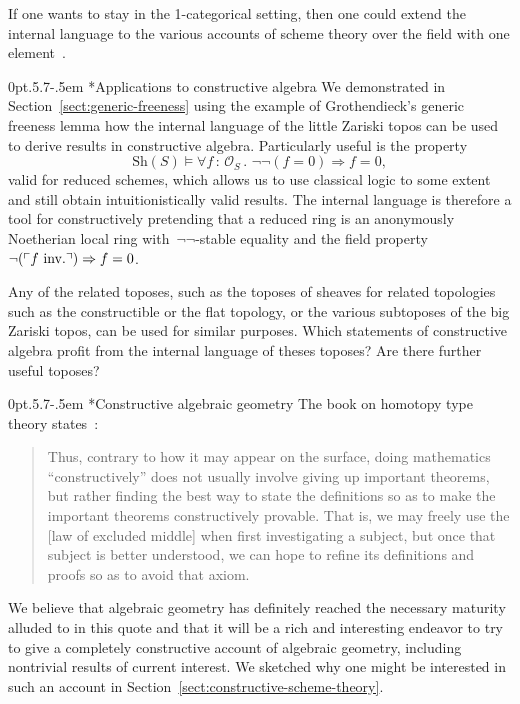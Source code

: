 \documentclass[10pt,reqno,a4paper]{amsbook}
\makeatletter
\theoremstyle{definition}
\theoremstyle{plain}
\theoremstyle{remark}
\renewcommand{\O}{\mathcal{O}}
\newcommand{\Sh}{\mathrm{Sh}}
\newcommand{\?}{\,{:}\,}
\renewcommand{\_}{\mathpunct{.}\,}
\newcommand{\speak}[1]{\ulcorner\text{\textnormal{#1}}\urcorner}
\newcommand{\inv}{inv.\@}
\def\subsection{\@startsection{subsection}{2}%
  {0pt}{.5\linespacing\@plus.7\linespacing}{-.5em}%
  {\normalfont\bfseries}}
\makeatother
\begin{document}
{If one wants to stay in the 1-categorical setting, then one could extend the
internal language to the various accounts of scheme theory over the field with
one element~\cite{pena-lorscheid:fun}.


\subsection*{Applications to constructive algebra} We demonstrated in
Section~\ref{sect:generic-freeness} using the example of Grothendieck's generic
freeness lemma how the internal language of the little Zariski topos can be
used to derive results in constructive algebra. Particularly useful is the
property
\[ \Sh(S) \models \forall f\?\O_S\_ \neg\neg(f = 0) \Longrightarrow f = 0, \]
valid for reduced schemes, which allows us to use classical logic to some
extent and still obtain intuitionistically valid results. The internal language
is therefore a tool for constructively pretending that a reduced ring is an
anonymously Noetherian
local ring with~$\neg\neg$-stable equality and the field
property~$\neg(\speak{$f$ \inv}) \Rightarrow f = 0$.

Any of the related toposes, such as the toposes of sheaves for related
topologies such as the constructible or the flat topology, or the various
subtoposes of the big Zariski topos, can be used for similar purposes.
Which statements of constructive algebra profit from the internal language of
theses toposes? Are there further useful toposes?


\subsection*{Constructive algebraic geometry} The book on homotopy type theory
states~\cite[Section~3.4]{hott}:
\begin{quote}
Thus, contrary to how it may appear on the surface, doing mathematics
``constructively'' does not usually involve giving up important theorems, but
rather finding the best way to state the definitions so as to make the important
theorems constructively provable. That is, we may freely use the [law of
excluded middle] when first investigating a subject, but once that subject is
better understood, we can hope to refine its definitions and proofs so as to
avoid that axiom.
\end{quote}
We believe that algebraic geometry has definitely reached the necessary
maturity alluded to in this quote and that it will be a rich and interesting
endeavor to try to give a completely constructive account of algebraic
geometry, including nontrivial results of current interest. We sketched why one
might be interested in such an account in
Section~\ref{sect:constructive-scheme-theory}.

}
\end{document}

